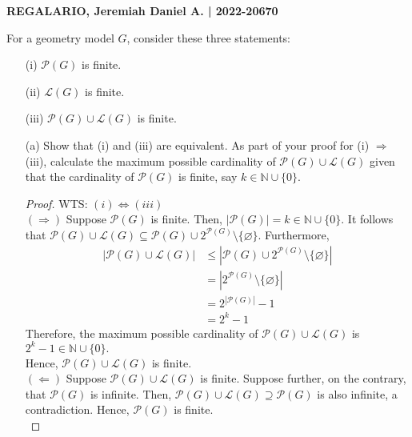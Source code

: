 \documentclass[a4paper, 10pt]{exam}
\begin{document}
\textbf{REGALARIO, Jeremiah Daniel A. | 2022-20670}
\begin{questions}
    \question For a geometry model $G$, consider these three statements:
    \begin{enumerate}
      \item[(i)] $\mathscr{P} (G)$ is finite.
      \item[(ii)] $\mathscr{L} (G)$ is finite.
      \item[(iii)] $\mathscr{P}(G) \cup \mathscr{L} (G)$ is finite.
    \end{enumerate}
    
    \begin{enumerate}
      \item[(a)] Show that (i) and (iii) are equivalent. As part of your proof for (i) $\Rightarrow$ (iii), calculate the maximum possible cardinality of $\mathscr{P}(G) \cup \mathscr{L}(G)$ given that the cardinality of $\mathscr{P}(G)$ is finite, say $k \in \mathbb{N} \cup \{0\}$.
        \begin{proof}
            WTS: $(i) \iff (iii)$\\
           $ (\Rightarrow)$ Suppose $\mathscr{P} (G) $ is finite. Then, $|\mathscr{P}(G)| = k \in \mathbb{N}\cup \{0\}.$ 
           It follows that $\mathscr{P}(G) \cup \mathscr{L} (G) \subseteq \mathscr{P}(G) \cup 2^{\mathscr{P} (G)} \setminus \{\varnothing\}.$ Furthermore,
           \begin{align*}
               |\mathscr{P}(G) \cup \mathscr{L} (G)| &\leq |\mathscr{P}(G) \cup 2^{\mathscr{P} (G)} \setminus \{\varnothing\}| \\
               &= |2^{\mathscr{P} (G)} \setminus \{\varnothing\}| \\
               &= 2^{|\mathscr{P} (G)|} - 1  \\
               &= 2^k - 1
           \end{align*}
            Therefore, the maximum possible cardinality of $\mathscr{P}(G) \cup \mathscr{L} (G)$ is $\boxed{2^k - 1} \in \mathbb{N} \cup \{0\}. $\\
            Hence, $\mathscr{P}(G) \cup \mathscr{L} (G)$ is finite. \\
            
           $ (\Leftarrow)$ Suppose $\mathscr{P}(G) \cup \mathscr{L} (G)$ is finite. Suppose further, on the contrary, that $\mathscr{P} (G)$ is infinite. Then, $\mathscr{P}(G) \cup \mathscr{L} (G) \supseteq \mathscr{P}(G)$ is also infinite, a contradiction. Hence, $\mathscr{P} (G)$ is finite. \\


\end{proof}
\end{enumerate}
\end{questions}
\end{document}
